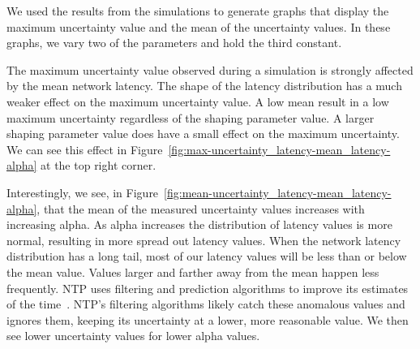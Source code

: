 

We used the results from the simulations to generate graphs that display the
maximum uncertainty value and the mean of the uncertainty values. In these
graphs, we vary two of the parameters and hold the third constant. 

The maximum uncertainty value observed during a simulation is strongly
affected by the mean network latency. The shape of the latency
distribution has a much weaker effect on the maximum uncertainty
value. A low mean result in a low maximum uncertainty regardless of
the shaping parameter value. A larger shaping parameter value does
have a small effect on the maximum uncertainty. We can see this effect
in Figure~\ref{fig:max-uncertainty_latency-mean_latency-alpha} at the
top right corner.

Interestingly, we see, in Figure~\ref{fig:mean-uncertainty_latency-mean_latency-alpha}, that the mean of the measured uncertainty values
increases with increasing alpha. As alpha increases the distribution of 
latency values is more normal, resulting in more spread out latency values.
When the network
latency distribution has a long tail, most of our latency values will be less
than or below the mean value. Values larger and farther away from the
mean happen less frequently. NTP uses
filtering and prediction algorithms to improve its estimates of the
time~\citep{Burbank2010}. NTP's filtering algorithms likely catch
these anomalous values and ignores them, keeping its uncertainty at a
lower, more reasonable value. We then see lower uncertainty values for
lower alpha values.

